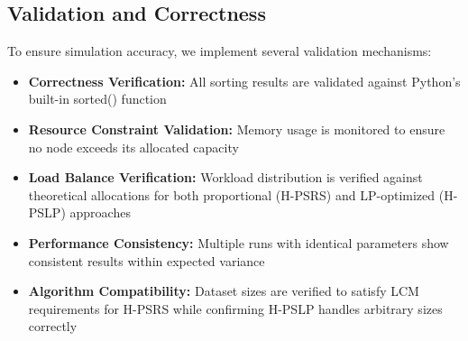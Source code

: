 \documentclass[]{interact}
\theoremstyle{plain}
\theoremstyle{definition}
\theoremstyle{remark}
\begin{document}
\subsection{Validation and Correctness}

To ensure simulation accuracy, we implement several validation mechanisms:

\begin{itemize}
\item \textbf{Correctness Verification:} All sorting results are validated against Python's built-in sorted() function
\item \textbf{Resource Constraint Validation:} Memory usage is monitored to ensure no node exceeds its allocated capacity
\item \textbf{Load Balance Verification:} Workload distribution is verified against theoretical allocations for both proportional (H-PSRS) and LP-optimized (H-PSLP) approaches
\item \textbf{Performance Consistency:} Multiple runs with identical parameters show consistent results within expected variance
\item \textbf{Algorithm Compatibility:} Dataset sizes are verified to satisfy LCM requirements for H-PSRS while confirming H-PSLP handles arbitrary sizes correctly
\end{itemize}







\end{document}
